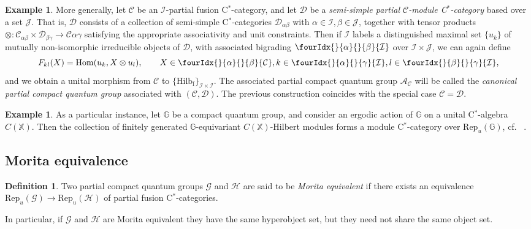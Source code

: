\documentclass[11pt]{article}
\DeclareMathOperator{\fin}{\mathrm{f}}
\DeclareMathOperator{\Hom}{Hom}
\newcommand{\G}{\mathbb{G}}
\newcommand{\CatC}{\mathcal{C}}
\newcommand{\CatD}{\mathcal{D}}
\newcommand{\CatCC}{\mathscr{C}}
\newcommand{\CatDD}{\mathscr{D}}
\newcommand{\Hilb}{\mathrm{Hilb}}
\newcommand{\Rep}{\mathrm{Rep}}
\newcommand{\Gr}[5]{\fourIdx{#2}{#4}{#3}{#5}{#1}}%
\newcommand{\Gru}[3]{\Gr{#1}{}{}{#2}{#3}}
\theoremstyle{definition}
\newtheorem{Def}[Theorem]{Definition}
\newtheorem{Exa}[Theorem]{Example}
\numberwithin{equation}{section}
\begin{document}
\begin{Exa} More generally, let $\CatCC$ be an $\mathscr{I}$-partial fusion C$^*$-category, and let $\CatDD$ be a \emph{semi-simple partial $\CatCC$-module C$^*$-category} based over a set $\mathscr{J}$. That is, $\CatDD$ consists of a collection of semi-simple C$^*$-categories $\CatD_{\alpha\beta}$ with $\alpha\in \mathscr{I},\beta\in \mathscr{J}$, together with tensor products $\otimes: \CatC_{\alpha\beta}\times \CatD_{\beta\gamma}\rightarrow \CatC{\alpha\gamma}$ satisfying the appropriate associativity and unit constraints. Then if $\mathcal{I}$ labels a distinguished maximal set $\{u_k\}$ of mutually non-isomorphic irreducible objects of $\CatD$, with associated bigrading $\Gru{\mathcal{I}}{\alpha}{\beta}$ over $\mathscr{I}\times \mathscr{J}$, we can again define \[F_{kl}(X)  = \Hom(u_k,  X\otimes u_l),\qquad X\in \Gru{\CatC}{\alpha}{\beta}, k\in \Gru{\mathcal{I}}{\alpha}{\gamma},l\in \Gru{\mathcal{I}}{\beta}{\gamma},\] and we obtain a unital morphism from $\CatCC$ to $\{\Hilb_{\fin}\}_{\mathcal{I}\times \mathcal{I}}$. The associated partial compact quantum group $\mathscr{A}_{\CatCC}$ will be called the \emph{canonical partial compact quantum group} associated with $(\CatCC,\CatDD)$. The previous construction coincides with the special case $\CatCC= \CatDD$.
\end{Exa}

\begin{Exa}\label{ExaErgo} As a particular instance, let $\G$ be a compact quantum group, and consider an ergodic action of $\G$ on a unital C$^*$-algebra $C(\mathbb{X})$. Then the collection of finitely generated $\G$-equivariant $C(\mathbb{X})$-Hilbert modules forms a module C$^*$-category over $\Rep_u(\G)$, cf.~ \cite{DCY1}. 
\end{Exa}

\subsection{Morita equivalence}


\begin{Def} Two partial compact quantum groups $\mathscr{G}$ and $\mathscr{H}$ are said to be \emph{Morita equivalent} if there exists an equivalence $\Rep_u(\mathscr{G}) \rightarrow \Rep_u(\mathscr{H})$ of partial fusion C$^*$-categories. 
\end{Def} 

In particular, if $\mathscr{G}$ and $\mathscr{H}$ are Morita equivalent they have the same hyperobject set, but they need not share the same object set.
\end{document}
